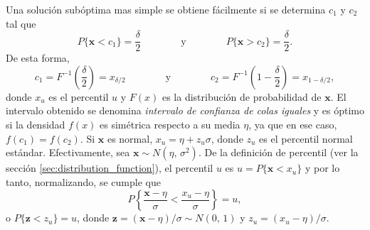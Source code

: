 \documentclass[a4paper]{report}
\newcommand{\x}{\mathbf{x}}
\newcommand{\z}{\mathbf{z}}
\begin{document}
Una solución subóptima mas simple se obtiene fácilmente si se determina \(c_1\) y \(c_2\) tal que 
\[
 P\{\x<c_1\}=\frac{\delta}{2}
  \qquad\qquad\textrm{y}\qquad\qquad
 P\{\x>c_2\}=\frac{\delta}{2}.
\]
De esta forma,
\[
 c_1=F^{-1}\left(\frac{\delta}{2}\right)=x_{\delta/2}
 \qquad\qquad\textrm{y}\qquad\qquad
 c_2=F^{-1}\left(1-\frac{\delta}{2}\right)=x_{1-\delta/2},
\]
donde \(x_u\) es el percentil \(u\) y \(F(x)\) es la distribución de probabilidad de \(\x\). El intervalo obtenido se denomina \emph{intervalo de confianza de colas iguales} y es óptimo si la densidad \(f(x)\) es simétrica respecto a su media \(\eta\), ya que en ese caso, \(f(c_1)=f(c_2)\).
Si \(\x\) es normal, \(x_u=\eta+z_u\sigma\), donde \(z_u\) es el percentil normal estándar. Efectivamente, sea \(\x\sim N(\eta,\,\sigma^2)\). De la definición de percentil (ver la sección \ref{sec:distribution_function}),  el percentil \(u\) es \(u=P\{\x<x_u\}\) y por lo tanto, normalizando, se cumple que
\[
 P\left\{\frac{\x-\eta}{\sigma}<\frac{x_u-\eta}{\sigma}\right\}=u,
\]
o \(P\{\z<z_u\}=u\), donde \(\z=(\x-\eta)/\sigma\sim N(0,\,1)\) y \(z_u=(x_u-\eta)/\sigma\).







\end{document}
